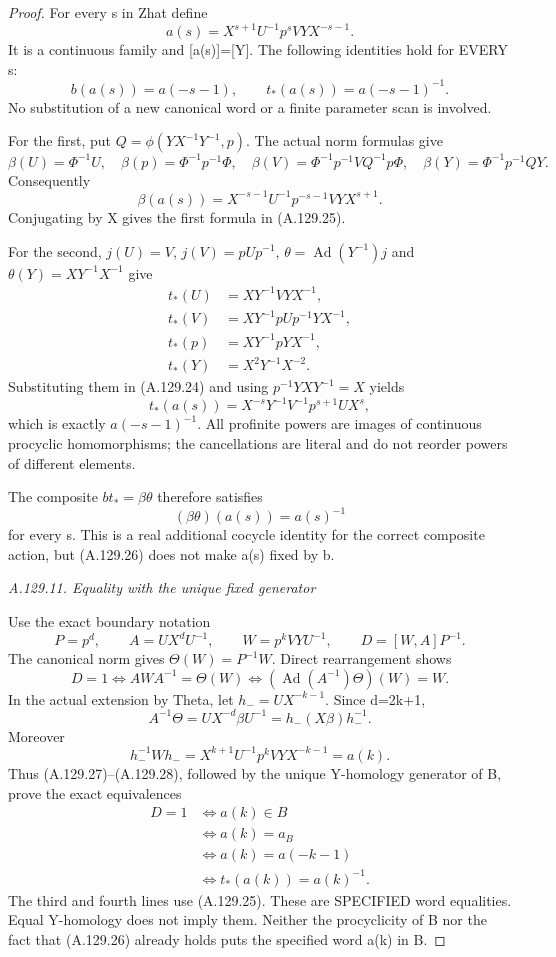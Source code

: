 \begin{proof}
For every s in Zhat define
\[
 a(s)=X^{s+1}U^{-1}p^sVY X^{-s-1}.
\tag{A.129.24}
\]
It is a continuous family and [a(s)]=[Y]. The following identities hold for EVERY s:
\[
 \boxed{b(a(s))=a(-s-1),\qquad
        t_*(a(s))=a(-s-1)^{-1}.}
\tag{A.129.25}
\]
No substitution of a new canonical word or a finite parameter scan is involved.

For the first, put \(Q=\phi(YX^{-1}Y^{-1},p)\). The actual norm formulas give
\[
 \beta(U)=\Phi^{-1}U,\quad
 \beta(p)=\Phi^{-1}p^{-1}\Phi,\quad
 \beta(V)=\Phi^{-1}p^{-1}VQ^{-1}p\Phi,\quad
 \beta(Y)=\Phi^{-1}p^{-1}QY.
\]
Consequently
\[
 \beta(a(s))=X^{-s-1}U^{-1}p^{-s-1}VY X^{s+1}.
\]
Conjugating by X gives the first formula in (A.129.25).

For the second, \(j(U)=V\), \(j(V)=pUp^{-1}\), \(\theta=\operatorname{Ad}(Y^{-1})j\) and \(\theta(Y)=XY^{-1}X^{-1}\) give
\[
\begin{aligned}
 t_*(U)&=XY^{-1}VYX^{-1},\\
 t_*(V)&=XY^{-1}pUp^{-1}YX^{-1},\\
 t_*(p)&=XY^{-1}pYX^{-1},\\
 t_*(Y)&=X^2Y^{-1}X^{-2}.
\end{aligned}
\]
Substituting them in (A.129.24) and using \(p^{-1}YXY^{-1}=X\) yields
\[
 t_*(a(s))=X^{-s}Y^{-1}V^{-1}p^{s+1}UX^s,
\]
which is exactly \(a(-s-1)^{-1}\). All profinite powers are images of continuous procyclic homomorphisms; the cancellations are literal and do not reorder powers of different elements.

The composite \(bt_*=\beta\theta\) therefore satisfies
\[
 (\beta\theta)(a(s))=a(s)^{-1}
\tag{A.129.26}
\]
for every s. This is a real additional cocycle identity for the correct composite action, but (A.129.26) does not make a(s) fixed by b.

\par\smallskip\noindent\emph{A.129.11. Equality with the unique fixed generator}

Use the exact boundary notation
\[
 P=p^d,\qquad A=UX^dU^{-1},\qquad
 W=p^kVYU^{-1},\qquad D=[W,A]P^{-1}.
\]
The canonical norm gives \(\Theta(W)=P^{-1}W\). Direct rearrangement shows
\[
 D=1\iff AWA^{-1}=\Theta(W)
      \iff (\operatorname{Ad}(A^{-1})\Theta)(W)=W.
\tag{A.129.27}
\]
In the actual extension by Theta, let \(h_-=UX^{-k-1}\). Since d=2k+1,
\[
 A^{-1}\Theta
 =UX^{-d}\beta U^{-1}
 =h_-(X\beta)h_-^{-1}.
\tag{A.129.28}
\]
Moreover
\[
 h_-^{-1}Wh_-=X^{k+1}U^{-1}p^kVY X^{-k-1}=a(k).
\]
Thus (A.129.27)--(A.129.28), followed by the unique Y-homology generator of B, prove the exact equivalences
\[
\boxed{\begin{aligned}
 D=1
 &\iff a(k)\in B\\
 &\iff a(k)=a_B\\
 &\iff a(k)=a(-k-1)\\
 &\iff t_*(a(k))=a(k)^{-1}.
\end{aligned}}
\tag{A.129.29}
\]
The third and fourth lines use (A.129.25). These are SPECIFIED word equalities. Equal Y-homology does not imply them. Neither the procyclicity of B nor the fact that (A.129.26) already holds puts the specified word a(k) in B.


\end{proof}
